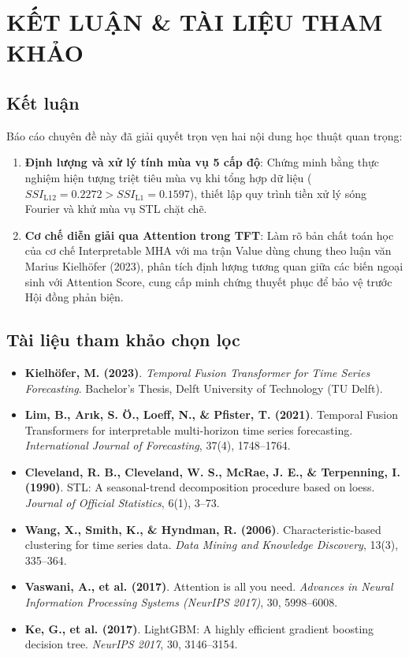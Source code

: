 \documentclass[12pt,a4paper,oneside]{article}
\begin{document}
\newpage
\section{KẾT LUẬN \& TÀI LIỆU THAM KHẢO}
\label{sec:ket_luan}

\subsection{Kết luận}
Báo cáo chuyên đề này đã giải quyết trọn vẹn hai nội dung học thuật quan trọng:
\begin{enumerate}
    \item \textbf{Định lượng và xử lý tính mùa vụ 5 cấp độ}: Chứng minh bằng thực nghiệm hiện tượng triệt tiêu mùa vụ khi tổng hợp dữ liệu ($SSI_{\text{L12}} = 0.2272 > SSI_{\text{L1}} = 0.1597$), thiết lập quy trình tiền xử lý sóng Fourier và khử mùa vụ STL chặt chẽ.
    \item \textbf{Cơ chế diễn giải qua Attention trong TFT}: Làm rõ bản chất toán học của cơ chế Interpretable MHA với ma trận Value dùng chung theo luận văn Marius Kielh\"{o}fer (2023), phân tích định lượng tương quan giữa các biến ngoại sinh với Attention Score, cung cấp minh chứng thuyết phục để bảo vệ trước Hội đồng phản biện.
\end{enumerate}

\subsection{Tài liệu tham khảo chọn lọc}
\begin{itemize}
    \item \textbf{Kielh\"{o}fer, M. (2023)}. \textit{Temporal Fusion Transformer for Time Series Forecasting}. Bachelor's Thesis, Delft University of Technology (TU Delft).
    \item \textbf{Lim, B., Ar{\i}k, S. {\"O}., Loeff, N., \& Pfister, T. (2021)}. Temporal Fusion Transformers for interpretable multi-horizon time series forecasting. \textit{International Journal of Forecasting}, 37(4), 1748--1764.
    \item \textbf{Cleveland, R. B., Cleveland, W. S., McRae, J. E., \& Terpenning, I. (1990)}. STL: A seasonal-trend decomposition procedure based on loess. \textit{Journal of Official Statistics}, 6(1), 3--73.
    \item \textbf{Wang, X., Smith, K., \& Hyndman, R. (2006)}. Characteristic-based clustering for time series data. \textit{Data Mining and Knowledge Discovery}, 13(3), 335--364.
    \item \textbf{Vaswani, A., et al. (2017)}. Attention is all you need. \textit{Advances in Neural Information Processing Systems (NeurIPS 2017)}, 30, 5998--6008.
    \item \textbf{Ke, G., et al. (2017)}. LightGBM: A highly efficient gradient boosting decision tree. \textit{NeurIPS 2017}, 30, 3146--3154.
\end{itemize}
\end{document}
